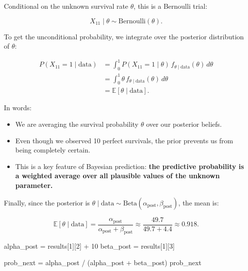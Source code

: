 \documentclass[
  letterpaper,
  DIV=11,
  numbers=noendperiod]{scrartcl}
\newenvironment{Shaded}{\begin{snugshade}}{\end{snugshade}}
\newcommand{\DecValTok}[1]{\textcolor[rgb]{0.68,0.00,0.00}{#1}}
\newcommand{\NormalTok}[1]{\textcolor[rgb]{0.00,0.23,0.31}{#1}}
\newcommand{\OperatorTok}[1]{\textcolor[rgb]{0.37,0.37,0.37}{#1}}
\providecommand{\tightlist}{%
  \setlength{\itemsep}{0pt}\setlength{\parskip}{0pt}}\usepackage{longtable,booktabs,array}
\begin{document}
Conditional on the unknown survival rate \(\theta\), this is a Bernoulli
trial:

\[
X_{11} \mid \theta \sim \text{Bernoulli}(\theta).
\]

To get the unconditional probability, we integrate over the posterior
distribution of \(\theta\):

\[
\begin{aligned}
P(X_{11}=1 \mid \text{data}) 
&= \int_0^1 P(X_{11}=1 \mid \theta) \, f_{\theta \mid \text{data}}(\theta) \, d\theta \\
&= \int_0^1 \theta \, f_{\theta \mid \text{data}}(\theta) \, d\theta \\
&= \mathbb{E}[\theta \mid \text{data}].
\end{aligned}
\]

In words:

\begin{itemize}
\tightlist
\item
  We are averaging the survival probability \(\theta\) over our
  posterior beliefs.
\item
  Even though we observed 10 perfect survivals, the prior prevents us
  from being completely certain.
\item
  This is a key feature of Bayesian prediction: \textbf{the predictive
  probability is a weighted average over all plausible values of the
  unknown parameter.}
\end{itemize}

Finally, since the posterior is
\(\theta \mid \text{data} \sim \text{Beta}(\alpha_{\text{post}},\beta_{\text{post}})\),
the mean is:

\[
\mathbb{E}[\theta \mid \text{data}] = \frac{\alpha_{\text{post}}}{\alpha_{\text{post}}+\beta_{\text{post}}} \approx \frac{49.7}{49.7+4.4} \approx 0.918.
\]

\begin{Shaded}
\begin{Highlighting}[]
\NormalTok{alpha\_post }\OperatorTok{=}\NormalTok{ results[}\DecValTok{1}\NormalTok{][}\DecValTok{2}\NormalTok{] }\OperatorTok{+} \DecValTok{10}
\NormalTok{beta\_post }\OperatorTok{=}\NormalTok{ results[}\DecValTok{1}\NormalTok{][}\DecValTok{3}\NormalTok{]}

\NormalTok{prob\_next }\OperatorTok{=}\NormalTok{ alpha\_post }\OperatorTok{/}\NormalTok{ (alpha\_post }\OperatorTok{+}\NormalTok{ beta\_post)}
\NormalTok{prob\_next}
\end{Highlighting}
\end{Shaded}
\end{document}
